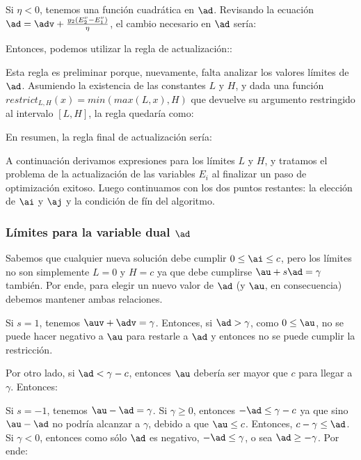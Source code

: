 Si $\eta <0$, tenemos una función cuadrática en $\ad$. Revisando la ecuación $\adadvequation{}$, el cambio necesario en $\ad$ sería:


Entonces, podemos utilizar la regla de actualización:: 

\ma{\ad \ass \adv+ \Delta \ad}

Esta regla es preliminar porque, nuevamente, falta analizar los valores límites de $\ad$. Asumiendo la existencia de las constantes $L$ y $H$, y dada una función $restrict_{L,H}(x) = min(max(L,x),H)$ que devuelve su argumento restringido al intervalo $[L,H]$, la regla quedaría como:

\ma{\ad \ass \updateneta}

En resumen, la regla final de actualización sería:


A continuación derivamos expresiones para los límites $L$ y $H$, y tratamos el problema de la actualización de las variables $E_i$ al finalizar un paso de optimización exitoso. Luego continuamos con los dos puntos restantes: la elección de $\ai$ y $\aj$ y la condición de fín del algoritmo.

\subsubsection{Límites para la variable dual $\ad$}

Sabemos que cualquier nueva solución debe cumplir $0 \leq \ai \leq c$, pero los límites no son simplemente $L=0$ y $H=c$ ya que debe cumplirse  $\au+s \ad = \gamma$ también. Por ende, para elegir un nuevo valor de $\ad$ (y $\au$, en consecuencia) debemos mantener ambas relaciones. 

Si $s=1$, tenemos $\auv+\adv=\gamma$. Entonces, si $\ad>\gamma$, como $0 \leq \au$, no se puede hacer negativo a $\au$ para restarle a $\ad$ y entonces no se puede cumplir la restricción.

Por otro lado, si $\ad < \gamma-c$, entonces $\au$ debería ser mayor que $c$ para llegar a $\gamma$. Entonces:



Si $s=-1$, tenemos $\au- \ad = \gamma$. Si $\gamma \geq 0$, entonces $-\ad \leq  \gamma-c$ ya que sino $\au - \ad$ no podría alcanzar a $\gamma$, debido a que $\au \leq c$. Entonces, $c-\gamma \leq \ad$. Si $\gamma <0$, entonces como sólo $\ad$ es negativo, $-\ad \leq \gamma$, o sea $\ad \geq -\gamma$. Por ende:

